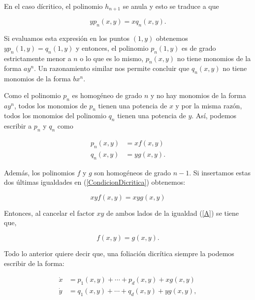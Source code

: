 En el caso dícritico, el polinomio $h_{n+1}$ se anula y esto se traduce a que

\begin{equation}
\label{CondicionDicritica}
yp_{n}(x,y)=xq_{n}(x,y).
\end{equation}

Si evaluamos esta expresión en los puntos $(1,y)$ obtenemos $yp_{n}(1,y)=q_{n}(1,y)$ y entonces, el polinomio $p_{n}(1,y)$ es de grado estrictamente menor a $n$ o lo que es lo mismo, $p_{n}(x,y)$ no tiene monomios de la forma $ay^{n}$. Un razonamiento similar nos permite concluir que $q_{n}(x,y)$ no tiene monomios de la forma $bx^{n}$.

Como el polinomio $p_{n}$ es homogéneo de grado $n$ y no hay monomios de la forma $ay^{n}$, todos los monomios de $p_{n}$ tienen una potencia de $x$ y por la misma razón, todos los monomios del polinomio $q_{n}$ tienen una potencia de $y$. Así, podemos escribir a $p_{n}$ y $q_{n}$ como

\begin{equation}
\begin{aligned}
p_{n}(x,y) &=xf(x,y)\\
q_{n}(x,y) &=yg(x,y).
\end{aligned}
\end{equation}

 \noindent Además, los polinomios $f$ y $g$ son homogéneos de grado $n-1$. Si insertamos estas dos últimas igualdades en (\ref{CondicionDicritica}) obtenemos:

\begin{equation}
\label{A}
xyf(x,y)=xyg(x,y)
\end{equation}

\noindent Entonces, al cancelar el factor $xy$ de ambos lados de la igualdad (\ref{A}) se tiene que,

\begin{equation}
f(x,y)=g(x,y).
\end{equation}

Todo lo anterior quiere decir que, una foliación dicrítica siempre la podemos escribir de la forma:

\begin{equation}
\label{EcuacionDicritica}
\begin{aligned}
\dot{x} &=p_{1}(x,y)+\cdots+p_{d}(x,y)+xg(x,y)\\
\dot{y} &=q_{1}(x,y)+\cdots+q_{d}(x,y)+yg(x,y),
\end{aligned}
\end{equation}

